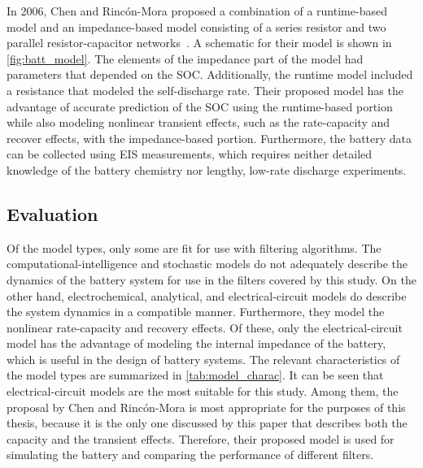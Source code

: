 \documentclass[../zhang_thesis.tex]{subfiles}
\begin{document}
In 2006, Chen and Rinc\'on-Mora proposed a combination of a runtime-based model and an impedance-based model consisting of a series resistor and two parallel resistor-capacitor networks~\cite{chen06}. A schematic for their model is shown in \cref{fig:batt_model}. The elements of the impedance part of the model had parameters that depended on the SOC. Additionally, the runtime model included a resistance that modeled the self-discharge rate. Their proposed model has the advantage of
accurate prediction of the SOC using the runtime-based portion while also modeling nonlinear transient effects, such as the rate-capacity and recover effects, with the impedance-based portion. Furthermore, the battery data can be collected using EIS measurements, which requires neither detailed knowledge of the battery chemistry nor lengthy, low-rate discharge experiments.

\subsection{Evaluation}

Of the model types, only some are fit for use with filtering algorithms. The computational-intelligence and stochastic models do not adequately describe the dynamics of the battery system for use in the filters covered by this study. On the other hand, electrochemical, analytical, and electrical-circuit models do describe the system dynamics in a compatible manner. Furthermore, they model the nonlinear rate-capacity and recovery effects. Of these, only the electrical-circuit model has the
advantage of modeling the internal impedance of the battery, which is useful in the design of battery systems. The relevant characteristics of the model types are summarized in \cref{tab:model_charac}. It can be seen that electrical-circuit models are the most suitable for this study. Among them, the proposal by Chen and Rinc\'on-Mora is most appropriate for the purposes of this thesis, because it is the only one discussed by this paper that describes both the capacity and the transient
effects. Therefore, their proposed model is used for simulating the battery and comparing the performance of different filters.
\end{document}

